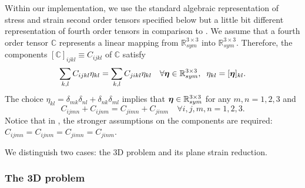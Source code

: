 \documentclass[a4paper,12pt]{article}
\theoremstyle{remark}
\newcommand{\mbf}[1]{\mbox{\boldmath$#1$}}
\numberwithin{equation}{section}
\begin{document}
Within our implementation, we use the standard algebraic representation of stress and strain second order tensors specified below but a little bit different representation of fourth order tensors in comparison to \cite[Appendix D]{NPO08}. We assume that a fourth order tensor $\mathbb C$ represents a linear mapping from $\mathbb R^{3\times 3}_{sym}$ into $\mathbb R^{3\times 3}_{sym}$. Therefore, the components $[\mathbb C]_{ijkl}\equiv C_{ijkl}$  of $\mathbb C$ satisfy
$$\sum_{k,l}C_{ijkl}\eta_{kl}=\sum_{k,l}C_{jikl}\eta_{kl}\quad\forall \mbf\eta\in \mathbb R^{3\times 3}_{sym},\;\;\eta_{kl}=[\mbf\eta]_{kl}.$$
The choice $\eta_{kl}=\delta_{mk}\delta_{nl}+\delta_{nk}\delta_{ml}$ implies that $\mbf\eta\in \mathbb R^{3\times 3}_{sym}$ for any $m,n=1,2,3$ and
\begin{equation}
\tag{B.1}
C_{ijmn}+C_{ijnm}=C_{jimn}+C_{jinm}\quad\forall i,j,m,n=1,2,3.
\label{C_sym}
\end{equation}
Notice that in \cite[Appendix D]{NPO08}, the stronger assumptions on the components are required: $C_{ijmn}=C_{ijnm}=C_{jimn}=C_{jinm}$.

We distinguish two cases: the 3D problem and its plane strain reduction.

\subsubsection*{The 3D problem}
\end{document}
